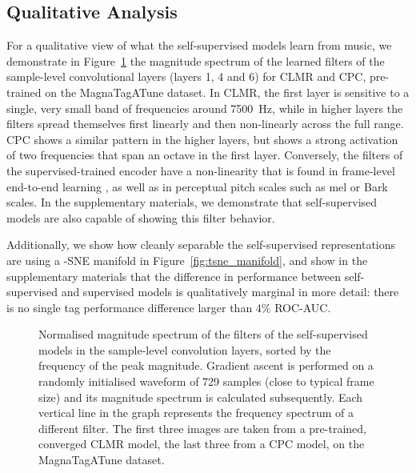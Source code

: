 \documentclass{article}
\begin{document}
\subsection{Qualitative Analysis}
For a qualitative view of what the self-supervised models learn from music, we demonstrate in Figure~\ref{fig:filter_visualisation} the magnitude spectrum of the learned filters of the sample-level convolutional layers (layers 1, 4 and 6) for CLMR and CPC, pre-trained on the MagnaTagATune dataset.
In CLMR, the first layer is sensitive to a single, very small band of frequencies around 7500~Hz, while in higher layers the filters spread themselves first linearly and then non-linearly across the full range.
CPC shows a similar pattern in the higher layers, but shows a strong activation of two frequencies that span an octave in the first layer.
Conversely, the filters of the supervised-trained encoder have a non-linearity that is found in frame-level end-to-end learning \cite{dieleman2014end}, as well as in perceptual pitch scales such as mel or Bark scales.
In the supplementary materials, we demonstrate that self-supervised models are also capable of showing this filter behavior.

Additionally, we show how cleanly separable the self-supervised representations are using a -SNE manifold \cite{maaten2008visualizing} in Figure~\ref{fig:tsne_manifold}, and show in the supplementary materials that the difference in performance between self-supervised and supervised models is qualitatively marginal in more detail: there is no single tag performance difference larger than 4\% ROC-AUC.

\begin{figure}[t]
    \centering
    \hfill
    \hfill
    \hfill
    \hfill
    \hfill
    \caption{Normalised magnitude spectrum of the filters of the self-supervised models in the sample-level convolution layers, sorted by the frequency of the peak magnitude.
Gradient ascent is performed on a randomly initialised waveform of 729 samples (close to typical frame size) and its magnitude spectrum is calculated subsequently.
Each vertical line in the graph represents the frequency spectrum of a different filter. The first three images are taken from a pre-trained, converged CLMR model, the last three from a CPC model, on the MagnaTagATune dataset.}
    \label{fig:filter_visualisation}
\end{figure}
 
\end{document}
